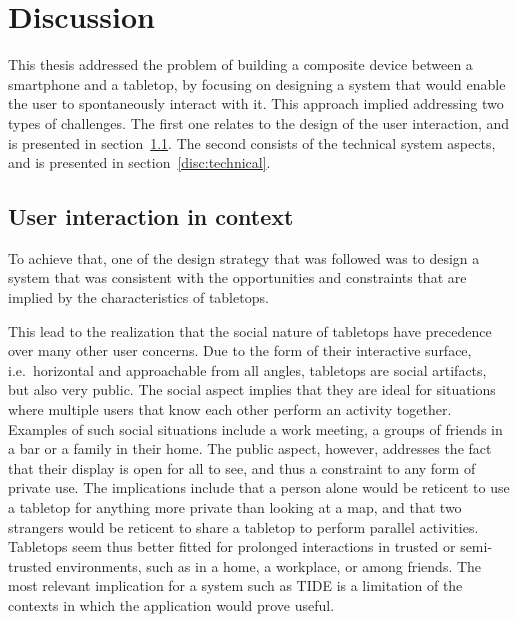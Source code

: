 \chapter{Discussion}
\label{discussion}

This thesis addressed the problem of building a composite device between a smartphone and a tabletop, by focusing on designing a system that would enable the user to spontaneously interact with it.
This approach implied addressing two types of challenges.
The first one relates to the design of the user interaction, and is presented in section~\ref{disc:ui}.
The second consists of the technical system aspects, and is presented in section~\ref{disc:technical}.

\section{User interaction in context}
\label{disc:ui}


To achieve that, one of the design strategy that was followed was to design a system that was consistent with the opportunities and constraints that are implied by the characteristics of tabletops.

This lead to the realization that the social nature of tabletops have precedence over many other user concerns.
Due to the form of their interactive surface, i.e.\ horizontal and approachable from all angles, tabletops are social artifacts,  but also very public.
The social aspect implies that they are ideal for situations where multiple users that know each other perform an activity together.
Examples of such social situations include a work meeting, a groups of friends in a bar or a family in their home.
The public aspect, however, addresses the fact that their display is open for all to see, and thus a constraint to any form of private use.
The implications include that a person alone would be reticent to use a tabletop for anything more private than looking at a map, and that two strangers would be reticent to share a tabletop to perform parallel activities.
Tabletops seem thus better fitted for prolonged interactions in trusted or semi-trusted environments, such as in a home, a workplace, or among friends.
The most relevant implication for a system such as TIDE is a limitation of the contexts in which the application would prove useful.

